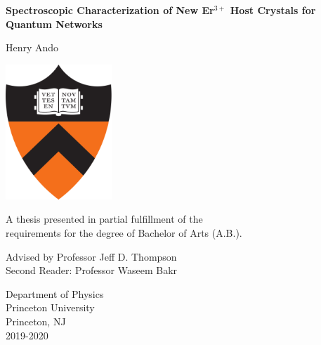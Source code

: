 \documentclass[12pt]{report}
\newcommand{\erbium}[1][ ]{Er$^{3+}$#1}
\begin{document}
\setcounter{page}{1}

\begin{titlepage}
  \singlespacing
  \begin{center}
    \vspace*{5mm}
    \Large{\textbf{Spectroscopic Characterization of New \erbium Host Crystals for Quantum Networks}}
    
    \vspace{0.5cm}
    
    \Large{Henry Ando}
    
    \vfill
    \includegraphics[height=2in]{Figures/Princeton.png}
    \vfill
    
    \normalsize{A thesis presented in partial fulfillment of the\\requirements for the degree of Bachelor of Arts (A.B.).}
    
    \vspace{0.8cm}
    
    \normalsize{Advised by Professor Jeff D. Thompson} \\
    \normalsize{Second Reader: Professor Waseem Bakr}
    
    \vspace{0.8cm}
    
    \normalsize{Department of Physics\\
      Princeton University\\
      Princeton, NJ\\
      2019-2020}
  \end{center}
\end{titlepage}
\end{document}
